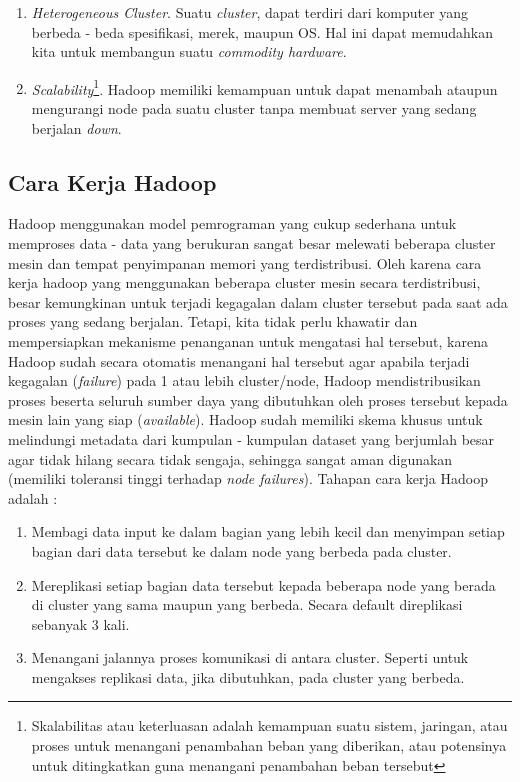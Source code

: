 \begin{enumerate}
	\item \textit{Heterogeneous Cluster}.
	Suatu \textit{cluster}, dapat terdiri dari komputer yang berbeda - beda spesifikasi, merek, maupun OS. Hal ini dapat memudahkan kita untuk membangun suatu \textit{commodity hardware}.
	\item \textit{Scalability}\footnote{Skalabilitas atau keterluasan adalah kemampuan suatu sistem, jaringan, atau proses untuk menangani penambahan beban yang diberikan, atau potensinya untuk ditingkatkan guna menangani penambahan beban tersebut}.
	Hadoop memiliki kemampuan untuk dapat menambah ataupun mengurangi node pada suatu cluster tanpa membuat server yang sedang berjalan \textit{down}.
	\end{enumerate}
	
	\subsection{Cara Kerja Hadoop}
	Hadoop menggunakan model pemrograman yang cukup sederhana untuk memproses data - data yang berukuran sangat besar melewati beberapa cluster mesin dan tempat penyimpanan memori yang terdistribusi. Oleh karena cara kerja hadoop yang menggunakan beberapa cluster mesin secara terdistribusi, besar kemungkinan untuk terjadi kegagalan dalam cluster tersebut pada saat ada proses yang sedang berjalan. Tetapi, kita tidak perlu khawatir dan mempersiapkan mekanisme penanganan untuk mengatasi hal tersebut, karena Hadoop sudah secara otomatis menangani hal tersebut agar apabila terjadi kegagalan (\textit{failure}) pada 1 atau lebih cluster/node, Hadoop mendistribusikan proses beserta seluruh sumber daya yang dibutuhkan oleh proses tersebut kepada mesin lain yang siap (\textit{available}). Hadoop sudah memiliki skema khusus untuk melindungi metadata dari kumpulan - kumpulan dataset yang berjumlah besar agar tidak hilang secara tidak sengaja, sehingga sangat aman digunakan (memiliki toleransi tinggi terhadap \textit{node failures}). Tahapan cara kerja Hadoop adalah \cite{Holmes:2012:HP:2543981} : 
	\begin{enumerate}
		\item Membagi data input ke dalam bagian yang lebih kecil dan menyimpan setiap bagian dari data tersebut ke dalam node yang berbeda pada cluster.
		\item Mereplikasi setiap bagian data tersebut kepada beberapa node yang berada di cluster yang sama maupun yang berbeda. Secara default direplikasi sebanyak 3 kali. %
		\item Menangani jalannya proses komunikasi di antara cluster. Seperti untuk mengakses replikasi data, jika dibutuhkan, pada cluster yang berbeda.
	\end{enumerate}

